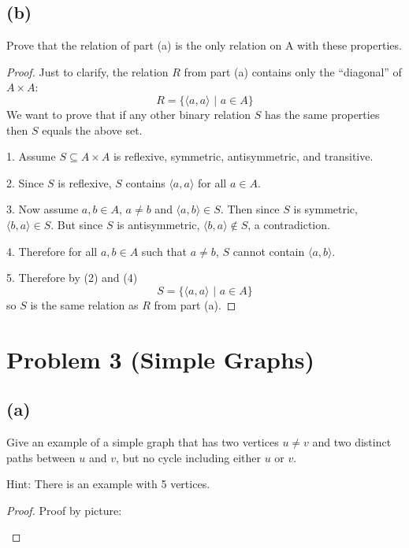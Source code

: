 \documentclass[14pt]{extarticle}
\begin{document}
\subsection{(b)}
Prove that the relation of part (a) is the only relation on A with these properties.
\begin{proof}
Just to clarify, the relation $R$ from part (a) contains only the ``diagonal'' of $A \times A$:
$$
R = \{\langle a, a\rangle \,\, | \,\, a \in A\}
$$
We want to prove that if any other binary relation $S$ has the same properties then $S$ equals the above set.

1. Assume $S \subseteq A \times A$ is reflexive, symmetric, antisymmetric, and transitive.

2. Since $S$ is reflexive, $S$ contains $\langle a,a \rangle$ for all $a \in A$.

3. Now assume $a, b \in A$, $a \neq b$ and $\langle a,b \rangle \in S$. Then since $S$ is symmetric, $\langle b,a \rangle \in S$. But since $S$ is antisymmetric, $\langle b,a \rangle \notin S$, a contradiction.

4. Therefore for all $a, b \in A$ such that $a \neq b$, $S$ cannot contain $\langle a,b \rangle$.

5. Therefore by (2) and (4)
$$
S = \{\langle a, a\rangle \,\, | \,\, a \in A\}
$$
so $S$ is the same relation as $R$ from part (a).
\end{proof}

\section{Problem 3 (Simple Graphs)}
\subsection{(a)}
Give an example of a simple graph that has two vertices $u \neq v$ and two distinct paths between $u$ and $v$, but no cycle including either $u$ or $v$.

Hint: There is an example with 5 vertices.
\begin{proof}
Proof by picture:
\begin{center}
\end{center}
\end{proof}
\end{document}
